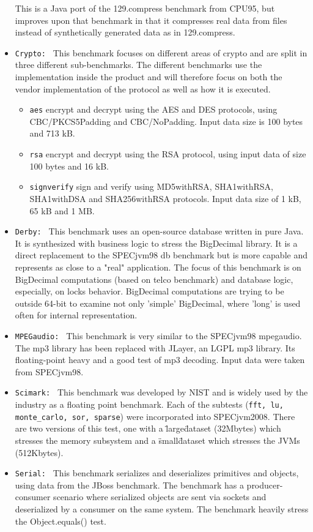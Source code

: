 \begin{itemize}
This is a Java port of the 129.compress benchmark from CPU95, but improves upon that benchmark in that it compresses real data from files instead of synthetically generated data as in 129.compress. 
 \item \texttt{Crypto: } This benchmark focuses on different areas of crypto and are split in three different sub-benchmarks. The different benchmarks use the implementation inside the product and will therefore focus on both the vendor implementation of the protocol as well as how it is executed.
  \begin{itemize}
    \item \texttt{aes} encrypt and decrypt using the AES and DES protocols, using CBC/PKCS5Padding and CBC/NoPadding. Input data size is 100 bytes and 713 kB.
    \item \texttt{rsa} encrypt and decrypt using the RSA protocol, using input data of size 100 bytes and 16 kB.
    \item \texttt{signverify} sign and verify using MD5withRSA, SHA1withRSA, SHA1withDSA and SHA256withRSA protocols. Input data size of 1 kB, 65 kB and 1 MB.
  \end{itemize}
\item \texttt{Derby: } This benchmark uses an open-source database written in pure Java. It is synthesized with business logic to stress the BigDecimal library. It is a direct replacement to the SPECjvm98 db benchmark but is more capable and represents as close to a "real" application. The focus of this benchmark is on BigDecimal computations (based on telco benchmark) and database logic, especially, on locks behavior. BigDecimal computations are trying to be outside 64-bit to examine not only 'simple' BigDecimal, where 'long' is used often for internal representation. 
\item \texttt{MPEGaudio: } This benchmark is very similar to the SPECjvm98 mpegaudio. The mp3 library has been replaced with JLayer, an LGPL mp3 library. Its floating-point heavy and a good test of mp3 decoding. Input data were taken from SPECjvm98.
\item \texttt{Scimark: } This benchmark was developed by NIST and is widely used by the industry as a floating point benchmark. Each of the subtests (\texttt{fft, lu, monte\_carlo, sor, sparse}) were incorporated into SPECjvm2008. There are two versions of this test, one with a \"large\" dataset (32Mbytes) which stresses the memory subsystem and a \"small\" dataset which stresses the JVMs (512Kbytes).
\item \texttt{Serial: } This benchmark serializes and deserializes primitives and objects, using data from the JBoss benchmark. The benchmark has a producer-consumer scenario where serialized objects are sent via sockets and deserialized by a consumer on the same system. The benchmark heavily stress the Object.equals() test.

\end{itemize}
